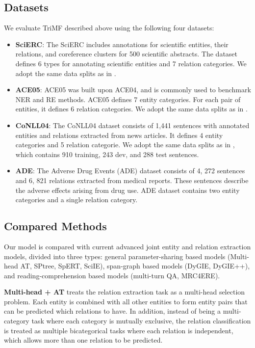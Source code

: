 \documentclass[sigconf]{acmart}
\begin{document}
\subsection{Datasets}

We evaluate TriMF described above using the following four datasets:

\begin{itemize}
\item \textbf{SciERC}: The SciERC  \cite{luan2018multi} includes annotations for scientific entities, their relations, and coreference clusters for 500 scientific abstracts. The dataset defines 6 types for annotating scientific entities and 7 relation categories. We adopt the same data splits as in \cite{luan2018multi}.
\item \textbf{ACE05}: ACE05 was built upon ACE04, and is commonly used to benchmark NER and RE methods. ACE05 defines 7 entity categories. For each pair of entities, it defines 6 relation categories. We adopt the same data splits as in \cite{miwa2016end}.

\item \textbf{CoNLL04}: The CoNLL04 dataset  \cite{roth2004linear} consists of 1,441 sentences with annotated entities and relations extracted from news articles. It defines 4 entity categories and 5 relation categorie. We adopt the same data splits as in \cite{gupta2016table}, which contains 910 training, 243 dev, and 288 test sentences.

\item \textbf{ADE}: The Adverse Drug Events (ADE) dataset  \cite{gurulingappa2012development} consists of 4, 272 sentences and 6, 821 relations extracted from medical reports. These sentences describe the adverse effects arising from drug use. ADE dataset contains two entity categories and a single relation category. 
\end{itemize}

\subsection{Compared Methods}
Our model is compared with current advanced joint entity and relation extraction models, divided into three types: general parameter-sharing based models (Multi-head AT, SPtree, SpERT, SciIE), span-graph based models (DyGIE, DyGIE++), and reading-comprehension based models (multi-turn QA, MRC4ERE).

\noindent \textbf{Multi-head + AT} \cite{bekoulis2018adversarial} treats the relation extraction task as a multi-head selection problem. Each entity is combined with all other entities to form entity pairs that can be predicted which relations to have. In addition, instead of being a multi-category task where each category is mutually exclusive, the relation classification is treated as multiple bicategorical tasks where each relation is independent, which allows more than one relation to be predicted.
\end{document}
